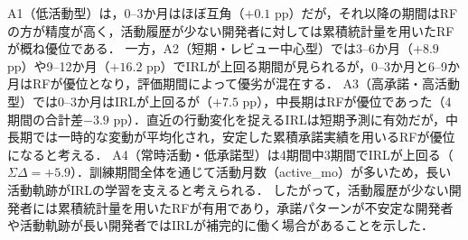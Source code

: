 \documentclass[submit,noauthor,ses,dvipdfmx]{ipsj}
\newcommand{\todo}[1]{\colorbox{yellow}{{\bf TODO}:}{\color{red} {\textbf{[#1]}}}}
\begin{document}
A1（低活動型）は，0--3か月はほぼ互角（$+0.1$ pp）だが，それ以降の期間はRFの方が精度が高く，活動履歴が少ない開発者に対しては累積統計量を用いたRFが概ね優位である．
一方，A2（短期・レビュー中心型）では3--6か月（$+8.9$ pp）や9--12か月（$+16.2$ pp）でIRLが上回る期間が見られるが，0--3か月と6--9か月はRFが優位となり，評価期間によって優劣が混在する．
A3（高承諾・高活動型）では0--3か月はIRLが上回るが（$+7.5$ pp），中長期はRFが優位であった（4期間の合計差$-3.9$ pp）．直近の行動変化を捉えるIRLは短期予測に有効だが，中長期では一時的な変動が平均化され，安定した累積承諾実績を用いるRFが優位になると考える．
A4（常時活動・低承諾型）は4期間中3期間でIRLが上回る（$\Sigma\Delta = +5.9$）．訓練期間全体を通じて活動月数（active\_mo）が多いため，長い活動軌跡がIRLの学習を支えると考えられる．
したがって，活動履歴が少ない開発者には累積統計量を用いたRFが有用であり，承諾パターンが不安定な開発者や活動軌跡が長い開発者ではIRLが補完的に働く場合があることを示した．





\end{document}
